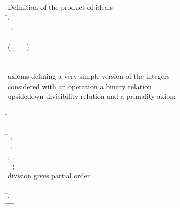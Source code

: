 \begin{hetcasl}
\> {\small{}\KW{\%\%} Definition of the product of ideals}\\
\> \Ax{\forall} \=,  \Ax{:}  \\
\> \Ax{\bullet} \=\Ax{\forall} ,  \Ax{:}  \Ax{\bullet} \=   \Ax{\wedge} \=   \Ax{\Rightarrow} \= \Ax{*}   \= \Ax{**} \\
\> \Ax{\bullet} \=\Ax{\forall}  \Ax{:}  \\
\>\> \Ax{\bullet} \=(\=\Ax{\forall} ,  \Ax{:}  \Ax{\bullet} \=   \Ax{\wedge} \=   \Ax{\Rightarrow} \= \Ax{*}   \= \Ax{**} ) \\
\>\>\> \Ax{\Rightarrow} \= \Ax{**}   \\
\\
{\small{}\KW{\%\%} axioms defining a very simple version of the integers\Ax{,}}\\
{\small{}\KW{\%\%} considered with an operation \Ax{*}\Ax{,} a binary relation \Ax{|}\Ax{|}}\\
{\small{}\KW{\%\%} \Ax{(}upside\Ax{-}down divisibility relation\Ax{)} and a primality axiom}\\
\\
\SPEC \= \Ax{=}\\
\> \SORT {}\\
\> \OPS \= \Ax{:} ;\\
\>\> \Ax{\_\_}\Ax{\_\_} \Ax{:} \= \Ax{\times}  \Ax{\rightarrow} , \\
\>\> , ,  \\
\> \PREDS \=\Ax{\_\_}\Ax{||}\Ax{\_\_} \Ax{:} \= \Ax{\times} ;\\
\>\> {\small{}\KW{\%\%} division gives partial order}\\
\>\>  \Ax{:} \\
\> \Ax{\forall} \=,  \Ax{:}  \\
\> \Ax{\bullet} \= \Ax{||}  \Ax{\Leftrightarrow} \=\Ax{\exists}  \Ax{:}  \Ax{\bullet} \= \Ax{=} \=  \\
\> {\small{}\KW{\%}\Ax{\%}}\\

\end{hetcasl}
